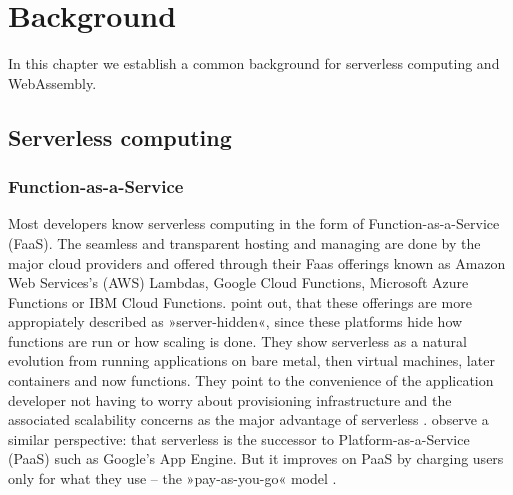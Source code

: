 \chapter{Background}
\label{chapter:background}

In this chapter we establish a common background for serverless computing and WebAssembly.

\section{Serverless computing}

\subsection{Function-as-a-Service}

\begin{quote}
\end{quote}

Most developers know serverless computing in the form of Function-as-a-Service (FaaS). The seamless and transparent hosting and managing are done by the major cloud providers and offered through their Faas offerings known as Amazon Web Services's (AWS) Lambdas, Google Cloud Functions, Microsoft Azure Functions or IBM Cloud Functions. \citeauthor{Fox2017} point out, that these offerings are more appropiately described as »server-hidden«, since these platforms hide how functions are run or how scaling is done. They show serverless as a natural evolution from running applications on bare metal, then virtual machines, later containers and now functions. They point to the convenience of the application developer not having to worry about provisioning infrastructure and the associated scalability concerns as the major advantage of serverless \cite{Fox2017}. \citeauthor{Castro2019} observe a similar perspective: that serverless is the successor to Platform-as-a-Service (PaaS) such as Google's App Engine. But it improves on PaaS by charging users only for what they use -- the »pay-as-you-go« model \cite{Castro2019}.


